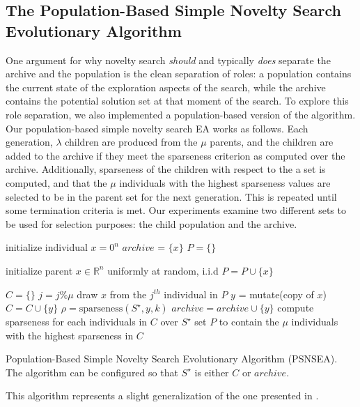\documentclass[twoside]{article}
\newcommand{\IR}{\mathbb{R}}
\begin{document}
\subsection{The Population-Based Simple Novelty Search Evolutionary Algorithm}
\label{subsec:sns}
One argument for why novelty search \emph{should} and typically \emph{does} separate the archive and the population is the clean separation of roles:  a population contains the current state of the exploration aspects of the search, while the archive contains the potential solution set at that moment of the search.  To explore this role separation, we also implemented a population-based version of the algorithm.  Our population-based simple novelty search EA works as follows.  Each generation, $\lambda$ children are produced from the $\mu$ parents, and the children are added to the archive if they meet the sparseness criterion as computed over the archive.  Additionally, sparseness of the children with respect to the a set is computed, and that the $\mu$ individuals with the highest sparseness values are selected to be in the parent set for the next generation.  This is repeated until some termination criteria is met.  Our experiments examine two different sets to be used for selection purposes:  the child population and the archive.
%
\begin{algorithm}[h]
  \SetAlgoLined
  \DontPrintSemicolon 
  
  \;
    
  initialize individual $x = 0^n$\;
  $archive$ = $\{x\}$\;
  $P = \{\}$
  
   {
    initialize parent $x \in \IR^n$ uniformly at random, i.i.d\;
    $P = P \cup \{x\}$\;
   }
   
   {
    $C = \{\}$\;
     {
      $j = j \% \mu$\;
      draw $x$ from the $j^{th}$ individual in $P$\;
      $y$ = mutate(copy of $x$)\;
      $C = C \cup \{y\}$\;
      $\rho = \mbox{sparseness}(S^\star, y, k)$\;
       {
        $archive = archive \cup \{y\}$\;
        }
     }
    compute sparseness for each individuals in $C$ over $S^\star$\;
    set $P$ to contain the $\mu$ individuals with the highest sparseness in $C$\; 
  }
  \caption{Population-Based Simple Novelty Search Evolutionary Algorithm (PSNSEA).  The algorithm can be configured so that $S^\star$ is either $C$ or $archive$.}
\end{algorithm}
%
This algorithm represents a slight generalization of the one presented in \citet{Wiegand2021flairs}.
\end{document}
